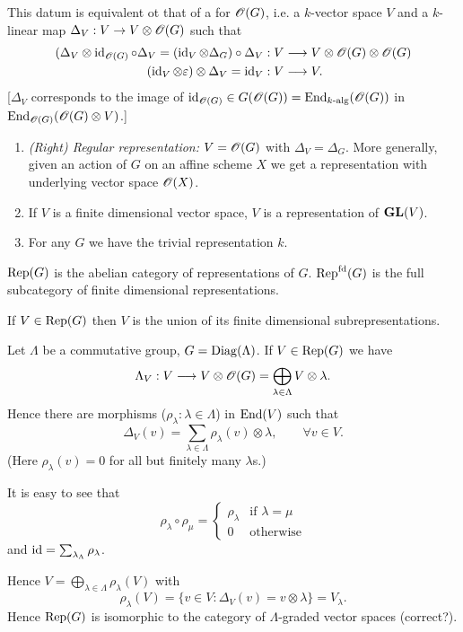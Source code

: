 This datum is equivalent ot that of a  for $\mathscr{O}(G)$, i.e. a $k$-vector
space $V$ and a $k$-linear map $\Delta_V:V\to V\otimes \OO(G)$ such that
\begin{align*}
	(\Delta_V\otimes\id_{\OO(G)}\circ \Delta_V = (\id_V\otimes \Delta_G)\circ \Delta_V
		&:V\to V\otimes\OO(G)\otimes\OO(G) \\
		(\id_V\otimes \eps)\otimes \Delta_V = \id_V &:V\to V.
	\end{align*}
	[$\Delta_V$ corresponds to the image of $\operatorname{id}_{\mathscr{O}(G)}\in
	G(\mathscr{O}(G))=\operatorname{End}_{k\text{-alg}}(\mathscr{O}(G))$ in $\operatorname{End}_{\mathscr{O}(G)}(\mathscr{O}(G)\otimes V)$.]
	\begin{example} \leavevmode
		\begin{enumerate}[(1)]
			\item \emph{(Right) Regular representation:} $V=\mathscr{O}(G)$ with $\Delta_V=\Delta_G$. More
				generally, given an action of $G$ on an affine scheme $X$ we get a representation
				with underlying vector space $\mathscr{O}(X)$.
			\item If $V$ is a finite dimensional vector space, $V$ is a representation of $\mathbf{GL}(V)$.
			\item For any $G$ we have the trivial representation $k$.
		\end{enumerate}
	\end{example}
	\begin{notation}
		$\operatorname{Rep}(G)$ is the abelian category of representations of $G$. $\operatorname{Rep}^{\text{fd}}(G)$ is the full
		subcategory of finite dimensional representations.
	\end{notation}

	If $V\in \operatorname{Rep}(G)$ then $V$ is the union of its finite dimensional subrepresentations.

	\begin{example}
		Let $\Lambda$ be a commutative group, $G=\operatorname{Diag}(\Lambda)$. If $V\in \operatorname{Rep}(G)$ we have
		\[
			\Lambda_V:V\to V\otimes\OO(G) = \bigoplus_{\lambda\in \Lambda}V\otimes\lambda
		.\]
		Hence there are morphisms ($\rho_\lambda:\lambda\in \Lambda$) in $\operatorname{End}(V)$ such that
		\[
			\Delta_V(v) = \sum_{\lambda\in \Lambda} \rho_\lambda(v)\otimes\lambda,\qquad \forall v\in V.
		\]
		(Here $\rho_\lambda(v)=0$ for all but finitely many $\lambda$s.)

		It is easy to see that
		\[
			\rho_\lambda\circ\rho_\mu =
			\begin{cases}
				\rho_\lambda & \text{if }\lambda=\mu \\
				0 & \text{otherwise}
			\end{cases}
		\]
		and $\operatorname{id} = \sum_{\lambda_\Lambda}\rho_\lambda$.

		Hence $V=\bigoplus_{\lambda\in \Lambda}\rho_\lambda(V)$ with
		\[
			\rho_\lambda(V) = \{v\in V : \Delta_V(v) = v\otimes \lambda\} = V_\lambda
		.\]
		Hence $\operatorname{Rep}(G)$ is isomorphic to the category of $\Lambda$-graded vector spaces (correct?).
	\end{example}
